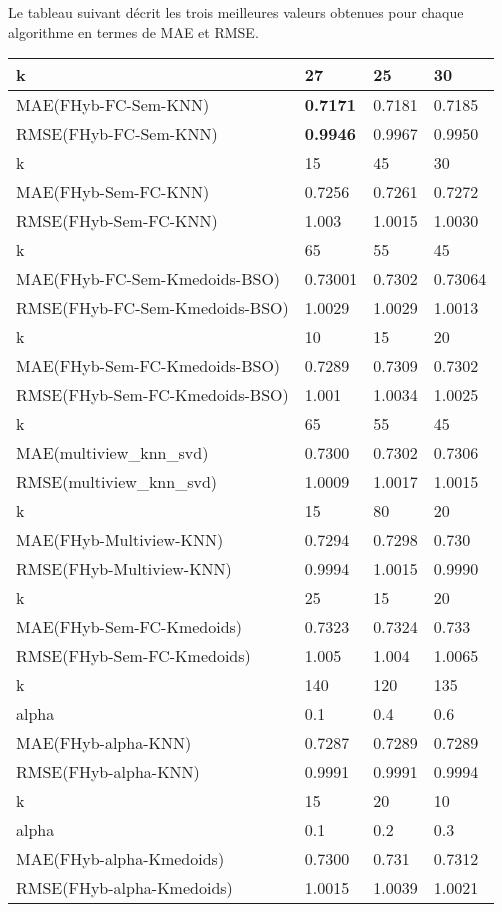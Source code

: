 Le tableau suivant décrit les trois meilleures valeurs obtenues pour chaque algorithme en termes de MAE et RMSE.
\begin{table}[H]
	\centering
	\begin{tabular}{|l|l|l|l|}
		\hline
		k & 27 & 25 & 30 \\ \hline
		MAE(FHyb-FC-Sem-KNN) & \textbf{0.7171} &  0.7181 & 0.7185 \\ \hline
		RMSE(FHyb-FC-Sem-KNN)& \textbf{0.9946} &  0.9967 & 0.9950 \\ \hline\hline
		k & 15 & 45 & 30 \\ \hline
		MAE(FHyb-Sem-FC-KNN) & 0.7256& 0.7261& 0.7272 \\ \hline
		RMSE(FHyb-Sem-FC-KNN) & 1.003 & 1.0015 & 1.0030 \\ \hline\hline
		k & 65 & 55 & 45 \\ \hline
		MAE(FHyb-FC-Sem-Kmedoids-BSO) & 0.73001 & 0.7302 & 0.73064 \\ \hline
		RMSE(FHyb-FC-Sem-Kmedoids-BSO) & 1.0029 & 1.0029 & 1.0013 \\ \hline\hline
		k & 10 & 15 & 20 \\ \hline
		MAE(FHyb-Sem-FC-Kmedoids-BSO) & 0.7289 & 0.7309 & 0.7302 \\ \hline
		RMSE(FHyb-Sem-FC-Kmedoids-BSO) & 1.001 & 1.0034 & 1.0025 \\ \hline\hline
		k & 65 & 55 & 45 \\ \hline
		MAE(multiview\_knn\_svd) & 0.7300 & 0.7302 & 0.7306\\ \hline
		RMSE(multiview\_knn\_svd) & 1.0009 & 1.0017 & 1.0015 \\ \hline\hline
		k & 15 & 80 & 20 \\ \hline
		MAE(FHyb-Multiview-KNN) & 0.7294 & 0.7298 & 0.730\\ \hline
		RMSE(FHyb-Multiview-KNN) & 0.9994& 1.0015 & 0.9990 \\ \hline\hline
		k & 25 & 15 & 20 \\ \hline
		MAE(FHyb-Sem-FC-Kmedoids) & 0.7323 & 0.7324& 0.733 \\ \hline
		RMSE(FHyb-Sem-FC-Kmedoids) & 1.005& 1.004 & 1.0065 \\ \hline\hline
		k & 140 & 120 & 135 \\ \hline
		alpha & 0.1 & 0.4 & 0.6 \\ \hline
		MAE(FHyb-alpha-KNN) & 0.7287 & 0.7289 & 0.7289 \\ \hline
		RMSE(FHyb-alpha-KNN)& 0.9991 & 0.9991 & 0.9994\\ \hline\hline
		k & 15 & 20 & 10 \\ \hline
		alpha & 0.1 & 0.2 & 0.3 \\ \hline
		MAE(FHyb-alpha-Kmedoids) & 0.7300& 0.731 & 0.7312 \\ \hline
		RMSE(FHyb-alpha-Kmedoids) & 1.0015 & 1.0039 & 1.0021 \\ \hline
	\end{tabular}
\end{table}
